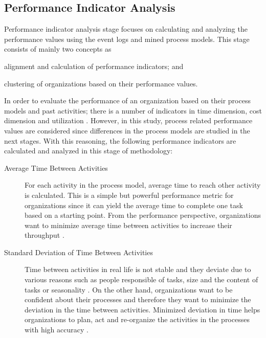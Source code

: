 \subsection{Performance Indicator Analysis}
\label{subsec:performance-indicator-analysis}
Performance indicator analysis stage focuses on calculating and analyzing the performance values using the event logs and mined process models. This stage consists of mainly two concepts as 
\begin{inparaenum}
\item alignment and calculation of performance indicators; and
\item clustering of organizations based on their performance values.
\end{inparaenum}
In order to evaluate the performance of an organization based on their process models and past activities; there is a number of indicators in time dimension, cost dimension and utilization \cite{van2011process}. However, in this study, process related performance values are considered since differences in the process models are studied in the next stages. With this reasoning, the following performance indicators are calculated and analyzed in this stage of methodology:
\begin{description}
	\item[Average Time Between Activities] For each activity in the process model, average time to reach other activity is calculated. This is a simple but powerful performance metric for organizations since it can yield the average time to complete one task based on a starting point. From the performance perspective, organizations want to minimize average time between activities to increase their throughput \cite{van2012replaying}.
	\item[Standard Deviation of Time Between Activities] Time between activities in real life is not stable and they deviate due to various reasons such as people responsible of tasks, size and the content of tasks or seasonality \cite{van2011process}. On the other hand, organizations want to be confident about their processes and therefore they want to minimize the deviation in the time between activities. Minimized deviation in time helps organizations to plan, act and re-organize the activities in the processes with high accuracy \cite{van2012replaying}. 
\end{description}